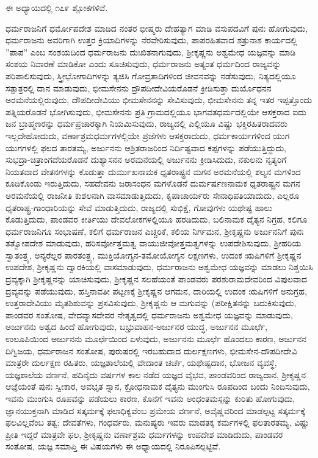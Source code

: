 ಈ ಅಧ್ಯಾಯದಲ್ಲಿ ೧೭೯ ಶ್ಲೋಕಗಳಿವೆ.

ಧರ್ಮರಾಜನಿಗೆ ಧರ್ಮೋಪದೇಶ ಮಾಡಿದ ನಂತರ ಭೀಷ್ಮರು ದೇಹತ್ಯಾಗ ಮಾಡಿ ವಸುಪದವಿಗೆ ಪುನಃ ಹೋಗುವುದು, ಧರ್ಮರಾಜನು ಅವರಿಗಾಗಿ ಉತ್ತರ ಕ್ರಿಯಾದಿಗಳನ್ನು ನೆರವೇರಿಸುವುದು, ಪಾಪರಹಿತವಾದ ಶತ್ರುನಾಶ ಕಾರ್ಯದಲ್ಲಿ ”ಪಾಪ” ಎಂಬ ಸಂಶಯದಿಂದ ಧರ್ಮರಾಜನು ದುಃಖಿತನಾಗುವುದು, ಶ‍್ರೀಕೃಷ್ಣನು ಅಶ್ವಮೇಧ ಯಜ್ಞವನ್ನು ಮಾಡಿ ಸಂಶಯ ನಿವಾರಣೆ ಮಾಡಿಕೋ ಎಂದು ಸೂಚಿಸುವುದು, ಧರ್ಮರಾಜನು ಅತ್ಯಂತ ಧರ್ಮದಿಂದ ರಾಜ್ಯವನ್ನು ಪರಿಪಾಲಿಸುವುದು, ಸ್ತ್ರೀಭೋಗಾದಿಗಳನ್ನು ತ್ಯಜಿಸಿ ಗೋವ್ರತಾದಿ\-ಗಳಿಂದ ಜೀವನವನ್ನು ನಡೆಸುವುದು, ನಿತ್ಯದಲ್ಲಿಯೂ ಸತ್ಪಾತ್ರರಲ್ಲಿ ದಾನ ಮಾಡುವುದು, ಭೀಮಸೇನನು ದ್ರೌಪದೀದೇವಿಯರೊಡನೆ ಕ್ರೀಡಿಸುತ್ತಾ ದುರ್ಯೊಧನನ ಅರಮನೆಯಲ್ಲಿರುವುದು, ದೌಪದೀದೇವಿಯು ಭೀಮಸೇನನನ್ನು ಸೇವಿಸುವುದು, ಭೀಮಸೇನನು ತನ್ನ ಇತರ ಇಪ್ಪತ್ತೊಂದು ಪತ್ನಿಯರೊಡನೆ ಭೋಗಿಸುವುದು, ಭೀಮಸೇನನು ಪ್ರತಿ ಗ್ರಾಮದಲ್ಲಿಯೂ ಭಾಗವತಧರ್ಮದಲ್ಲಿಯೇ ಆಸಕ್ತರಾದ ಐದು ಜನ ಬ್ರಾಹ್ಮಣರನ್ನು ಧರ್ಮಪ್ರಚಾರಕ್ಕಾಗಿ ನಿಯಮಿಸುವುದು, ರಾಜ್ಯದಲ್ಲಿ ಎಲ್ಲಿಯೂ ವಿಷ್ಣು ಭಕ್ತಿರಹಿತರಾದವರು ಇಲ್ಲದೇಹೋದುದು, ವರ್ಣಾಶ್ರಮಧರ್ಮಗಳಲ್ಲಿಯೇ ಪ್ರಜೆಗಳು ಆಸಕ್ತರಾದುದು, ಧರ್ಮಕಾರ್ಯಗಳಿಂದ ಯುಗ ಯುಗಗಳಲ್ಲಿ ಫಲದ ತಾರತಮ್ಯ, ಅರ್ಜುನನು ಆಶ್ರಿತರಾಜರಿಂದ ನಿರ್ದಿಷ್ಟವಾದ ಕಪ್ಪಗಳನ್ನು ಪಡೆಯುತ್ತಿದ್ದುದು, ಸುಭದ್ರಾ-ಚಿತ್ರಾಂಗದೆಯರೊಡನೆ ದುಶ್ಯಾಸನನ ಅರಮನೆಯಲ್ಲಿ ಅರ್ಜುನನು ಕ್ರೀಡಿಸಿದುದು, ನಕುಲನು ನೃತ್ಯರಿಗೆ ನಿಯತವಾದ ವೇತನಗಳನ್ನು ಕೊಡುತ್ತಾ ದುರ್ಮುಖನಾಮಕ ಧೃತರಾಷ್ಟ್ರನ ಮಗನ ಅರಮನೆಯಲ್ಲಿ ಶಲ್ಯನ ಮಗಳಿಂದ ಕೂಡಿಕೊಂಡು ಇರುತ್ತಿದುದು, ಸಹದೇವನು ಜರಾಸಂಧನ ಮಗಳೊಡನೆ ದುರ್ಮರ್ಷಣನಾಮಕ ಧೃತರಾಷ್ಟ್ರನ ಮಗನ ಅರಮನೆಯಲ್ಲಿ ರಾಜನೀತಿ ಕುಶಲನಾಗಿ ವಾಸಮಾಡುತ್ತಿದುದು, ಕೃಪಾಚಾರ್ಯರು ಸೇನಾಧಿಪತಿಯಾದುದು, ಎಲ್ಲರೂ ಧೃತರಾಷ್ಟ್ರ-ಗಾಂಧಾರಿ\-ಯನ್ನು ಸೇವೆ ಮಾಡುತ್ತಿದುದು, ರಾಜ್ಯದಲ್ಲಿ ಸುಭಿಕ್ಷೆ, ಗೋವುಗಳು ಯಥೇಷ್ಟ ಹಾಲು ಕೊಡುತ್ತಿದುದು, ಪಾಂಡವರ ಕೀರ್ತಿಯು ದೇವಲೋಕಗಳಲ್ಲಿಯೂ ಹರಡಿದುದು, ಬಲಿನಾಮಕ ದೈತ್ಯನ ನಿಗ್ರಹ, ಕಲಿಗೂ ಧರ್ಮರಾಜನಿಗೂ ಸಂಭಾಷಣೆ, ಕಲಿಗೆ ಧರ್ಮರಾಜನ ಎಚ್ಚರಿಕೆ, ಕಲಿಯ ನಿರ್ಗಮನ, ಶ‍್ರೀಕೃಷ್ಣನು ಅರ್ಜುನನಿಗೆ ಪುನಃ ತತ್ವೋಪದೇಶ ಮಾಡುವುದು, ಹರಿಸರ್ವೋತ್ತಮತ್ವ ವಾಯುಜೀವೋತ್ತಮತ್ವಗಳನ್ನು ಉಪದೇಶಿಸುವುದು, ಶ‍್ರೀಹರಿಯ ಸ್ವಾತಂತ್ರ್ಯ, ಅನ್ಯರೆಲ್ಲರ ಪಾರತಂತ್ರ್ಯ, ಮುಕ್ತಿಯೋಗ್ಯನ-ತಮೋಯೋಗ್ಯನ ಲಕ್ಷಣಗಳು, ಉದಂಕ ಋಷಿಗಳಿಗೆ ಶ‍್ರೀಕೃಷ್ಣನ ಉಪದೇಶ, ಶ‍್ರೀಕೃಷ್ಣನು ದ್ವಾರಕಿಯಲ್ಲಿ ವಾಸಮಾಡುವುದು, ಧರ್ಮರಾಜನು ಅಶ್ವಮೇಧ ಯಜ್ಞವನ್ನು ಮಾಡಲು ನಿಶ್ಚಯಿಸಿ ದ್ರವ್ಯಕ್ಕಾಗಿ ಶ‍್ರೀಕೃಷ್ಣನನ್ನು ಯಾಚಿಸುವುದು, ಶ‍್ರೀಕೃಷ್ಣನ ಸಲಹೆಯಂತೆ ಪಾಂಡವರು ಪರಶುರಾಮದೇವರಿಂದ ವಿಪುಲವಾದ ದ್ರವ್ಯವನ್ನು ಪಡೆಯುವುದು, ಹಸ್ತಿನಾವತೀ ಪಟ್ಟಣಕ್ಕೆ ಶ‍್ರೀಕೃಷ್ಣನ ಆಗಮನ, ದಾರಿಯಲ್ಲಿ ಉದಂಕ ಋಷಿಗಳಿಗೆ ಅನುಗ್ರಹ, ಉತ್ತರಾದೇವಿಯು ಮೃತಶಿಶುವನ್ನು ಪ್ರಸವಿಸುವುದು, ಶ‍್ರೀಕೃಷ್ಣನು ಆ ಮಗುವನ್ನು (ಪರೀಕ್ಷಿತನನ್ನು ಬದುಕಿಸುವುದು, ಪಾಂಡವರ ಸಂತೋಷ, ವೇದವ್ಯಾಸದೇವರ ನೇತೃತ್ವದಲ್ಲಿ ಧರ್ಮರಾಜನು ಅಶ್ವಮೇಧ ಯಜ್ಞವನ್ನು ಮಾಡುವುದು, ಅರ್ಜುನನು ಅಶ್ವದ ಹಿಂದೆ ಹೋಗುವುದು, ಬಭ್ರುವಾಹನ-ಅರ್ಜುನರ ಯುದ್ಧ, ಅರ್ಜುನನ ಮೂರ್ಛೆ, ಉಲೂಪಿಯಿಂದ ಅರ್ಜುನನು ಮೂರ್ಛೆಯಿಂದ ಏಳುವುದು, ಅರ್ಜುನನು ಮೂರ್ಛೆ ಹೊಂದಲು ಕಾರಣ, ಅರ್ಜುನನ ದಿಗ್ವಿಜಯ, ಧರ್ಮರಾಜನ ಸಂತೋಷ, ಪುರುಷರಲ್ಲಿ ಇರಬಹುದಾದ ದುರ್ಲಕ್ಷಣಗಳು, ಭೀಮಸೇನ-ದೌಪದೀದೇವಿ ಮಾತ್ರರೇ ದುರ್ಲಕ್ಷಣ ರಹಿತರು, ಯಜ್ಞಶಾಲೆಯಲ್ಲಿ ವೇದಾಂತ ಚರ್ಚೆ, ಯಥೇಷ್ಟದಾನ, ಭೋಜನ ವ್ಯವಸ್ಥೆ, ಯಜ್ಞಶಾಲೆಯ ವರ್ಣನೆ, ಹದಿನೈದು ವರ್ಷಗಳ ಕಾಲ ನಡೆದ ಯಜ್ಞದ ವೈಭವ, ಪಾಂಡವರಿಂದ ರಾಜ್ಯದಾನ, ಶ‍್ರೀಕೃಷ್ಣನ ಆಜ್ಞೆಯಂತೆ ಪುನಃ ಸ್ವೀಕಾರ, ಅವಭೃತ ಸ್ನಾನ, ಕ್ರೋಧನಾಮಕ ದೈತ್ಯನು ಮುಂಗುಸಿ ರೂಪದಿಂದ ಬಂದು ನಿಂದಿಸುವುದು, ಇವನು ಮುಂಗುಸಿ ರೂಪವನ್ನು ಪಡೆಯಲು ಕಾರಣ, ಕೊನೆಗೆ ಇವನು ಅಂಧಂತಮಸ್ಸನ್ನು ಕುರಿತು ಹೋಗುವುದು, ಜ್ಞಾನಯುಕ್ತನಾಗಿ ಮಾಡಿದ ಸತ್ಕರ್ಮಕ್ಕೆ ಫಲಾಧಿಕ್ಯವೆಂಬ ಪ್ರಮೇಯ ವರ್ಣನೆ, ಅವೈಷ್ಣವರಿಂದ ಮಾಡಲ್ಪಟ್ಟ ಸತ್ಕರ್ಮಕ್ಕೆ ಫಲವಿಲ್ಲವೆಂಬ ತತ್ವ; ದೇವತೆಗಳು, ಗಂಧರ್ವರು, ಮನುಷ್ಯರು ಇವರು ಮಾಡತಕ್ಕ ಕರ್ಮಗಳಲ್ಲಿ ಫಲತಾರತಮ್ಯ, ವಿಷ್ಣು ಪ್ರೀತಿ ಇದ್ದರೆ ಮಾತ್ರವೇ ಫಲ, ಶ‍್ರೀಕೃಷ್ಣನು ವರ್ಣಾಶ್ರಮ ಧರ್ಮಗಳನ್ನು ಉಪದೇಶ ಮಾಡಿದುದು, ಪಾಂಡವರ ಸಂತೋಷ, ಯಜ್ಞ ಸಮಾಪ್ತಿ ಈ ವಿಷಯಗಳು ಈ ಅಧ್ಯಾಯದಲ್ಲಿ ನಿರೂಪಿಸಲ್ಪಟ್ಟಿವೆ.

